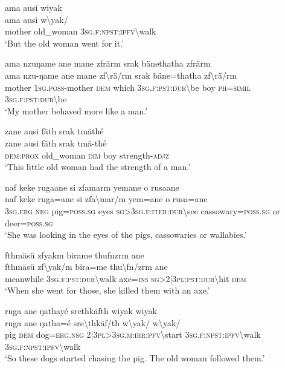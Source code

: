 \ea\label{ex:14:a2968}
ama ausi wiyak\\
\gll ama	ausi	w{\textbackslash}yak/\\
     mother	old\_woman	3\textsc{sg}.\textsc{f}:\textsc{npst}:\textsc{ipfv}{\textbackslash}walk\\
\glt `But the old woman went for it.'
\z

\ea\label{ex:14:a2969}
ama nzuŋame ane mane zfrärm srak bänethatha zfrärm\\
\gll ama	nzu-ŋame	ane	mane	zf{\textbackslash}rä/rm	srak	bäne=thatha	zf{\textbackslash}rä/rm\\
     mother	1\textsc{sg}.\textsc{poss}-mother	\textsc{dem}	which	3\textsc{sg}.\textsc{f}:\textsc{pst}:\textsc{dur}{\textbackslash}be	boy	\textsc{ph}=\textsc{simil}	3\textsc{sg}.\textsc{f}:\textsc{pst}:\textsc{dur}{\textbackslash}be\\
\glt `My mother behaved more like a man.'
\z

\ea\label{ex:14:a2971}
zane ausi fäth srak tmäthé\\
\gll zane	ausi	fäth	srak	tmä-thé\\
     \textsc{dem}:\textsc{prox}	old\_woman	\textsc{dim}	boy	strength-\textsc{adjz}\\
\glt `This little old woman had the strength of a man.'
\z

\ea\label{ex:14:a2973}
naf keke rugaane si zfamarm yemane o rusaane\\
\gll naf	keke	ruga=ane	si	zfa{\textbackslash}mar/m	yem=ane	o	rusa=ane\\
     3\textsc{sg}.\textsc{erg}	\textsc{neg}	pig=\textsc{poss}.\textsc{sg}	eyes	\textsc{sg}>3\textsc{sg}.\textsc{f}:\textsc{iter}:\textsc{dur}{\textbackslash}see	cassowary=\textsc{poss}.\textsc{sg}	or	deer=\textsc{poss}.\textsc{sg}\\
\glt `She was looking in the eyes of the pigs, cassowaries or wallabies.'
\z

\ea\label{ex:14:a2974}
fthmäsü zfyakm birame thufnzrm ane\\
\gll fthmäsü	zf{\textbackslash}yak/m	bira=me	thu{\textbackslash}fn/zrm	ane\\
     meanwhile	3\textsc{sg}.\textsc{f}:\textsc{pst}:\textsc{dur}{\textbackslash}walk	axe=\textsc{ins}	\textsc{sg}>2|3\textsc{pl}:\textsc{pst}:\textsc{dur}{\textbackslash}hit	\textsc{dem}\\
\glt `When she went for those, she killed them with an axe.'
\z

\ea\label{ex:14:a2977}
ruga ane ŋathayé srethkäfth wiyak wiyak\\
\gll ruga	ane	ŋatha=é	sre{\textbackslash}thkäf/th	w{\textbackslash}yak/	w{\textbackslash}yak/\\
     pig	\textsc{dem}	dog=\textsc{erg}.\textsc{nsg}	2|3\textsc{pl}>3\textsc{sg}.\textsc{m}:\textsc{irr}:\textsc{pfv}{\textbackslash}start	3\textsc{sg}.\textsc{f}:\textsc{npst}:\textsc{ipfv}{\textbackslash}walk	3\textsc{sg}.\textsc{f}:\textsc{npst}:\textsc{ipfv}{\textbackslash}walk\\
\glt `So these dogs started chasing the pig. The old woman followed them.'
\z

